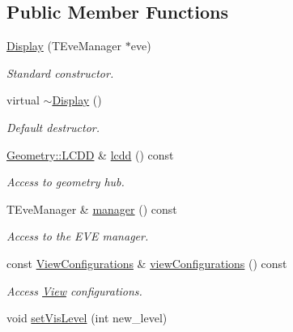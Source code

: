 \subsection*{Public Member Functions}
\begin{DoxyCompactItemize}
\item 
\hyperlink{class_d_d4hep_1_1_display_a9038e67619d22b62a928fa32d912ea10}{Display} (TEveManager $\ast$eve)
\begin{DoxyCompactList}\small\item\em Standard constructor. \item\end{DoxyCompactList}\item 
virtual \hyperlink{class_d_d4hep_1_1_display_ac2607a6bb236c55547a4223d40d85d1f}{$\sim$Display} ()
\begin{DoxyCompactList}\small\item\em Default destructor. \item\end{DoxyCompactList}\item 
\hyperlink{class_d_d4hep_1_1_geometry_1_1_l_c_d_d}{Geometry::LCDD} \& \hyperlink{class_d_d4hep_1_1_display_a5c51efe89ea7d42489821f4f38c2b180}{lcdd} () const 
\begin{DoxyCompactList}\small\item\em Access to geometry hub. \item\end{DoxyCompactList}\item 
TEveManager \& \hyperlink{class_d_d4hep_1_1_display_a90c0d17c6cc028ebaffa729e30f20ed6}{manager} () const 
\begin{DoxyCompactList}\small\item\em Access to the EVE manager. \item\end{DoxyCompactList}\item 
const \hyperlink{class_d_d4hep_1_1_display_a1bb7fbc1eeb22ef2b1cea35c78e9d27a}{ViewConfigurations} \& \hyperlink{class_d_d4hep_1_1_display_a3d7c3cb7abd7bf12ba8ae4b5f391f2a6}{viewConfigurations} () const 
\begin{DoxyCompactList}\small\item\em Access \hyperlink{class_d_d4hep_1_1_view}{View} configurations. \item\end{DoxyCompactList}\item 
void \hyperlink{class_d_d4hep_1_1_display_a57cf9b4b15b4627ac264bc95583ace91}{setVisLevel} (int new\_\-level)

\end{DoxyCompactItemize}
